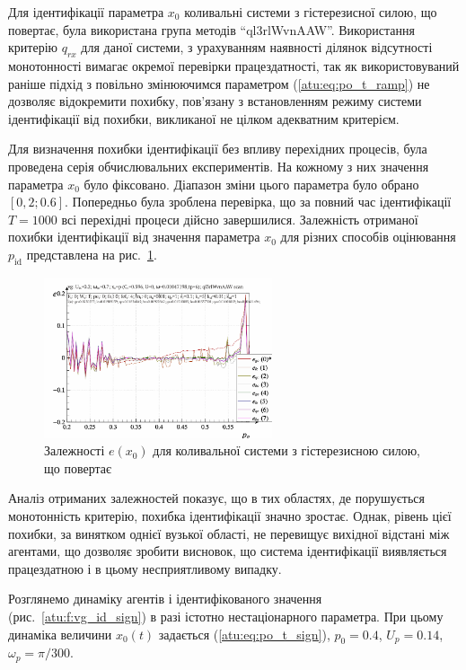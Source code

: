 Для ідентифікації параметра
$x_0$ коливальні системи з гістерезисної силою, що повертає, була
використана група методів ``ql3rlWvnAAW''. Використання критерію
$q_{rx}$ для даної системи, з урахуванням наявності ділянок
відсутності монотонності вимагає окремої перевірки
працездатності, так як використовуваний раніше підхід
з повільно змінюючимся параметром (\ref{atu:eq:po_t_ramp}) не дозволяє
відокремити похибку, пов'язану з встановленням режиму системи
ідентифікації від похибки, викликаної не цілком адекватним
критерієм.

Для визначення похибки ідентифікації без впливу перехідних
процесів, була проведена серія обчислювальних експериментів.
На кожному з них значення параметра
$x_0$ було фіксовано. Діапазон зміни цього параметра було обрано
$[0,2; 0.6] $. Попередньо була зроблена перевірка, що за повний час
ідентифікації
$T = 1000 $ всі перехідні процеси дійсно завершилися. Залежність
отриманої похибки ідентифікації від значення параметра
$x_0 $ для різних способів оцінювання
$p_\mathrm{id} $ представлена на рис.~\ref{atu:f:vg_id_scan}.

\begin{figure}[htb!]
\begin{center}
  \includegraphics[width=0.60\textwidth]{p/cha/vg/vg_id-p_p_e_ql3rlWvnAAW_scan.png}
\end{center}
\caption{Залежності $e(x_0) $ для коливальної системи з гістерезисною силою, що повертає }
\label{atu:f:vg_id_scan}
\end{figure}

Аналіз отриманих залежностей показує, що в тих областях, де
порушується монотонність критерію, похибка ідентифікації
значно зростає. Однак, рівень цієї похибки, за винятком однієї
вузької області, не перевищує вихідної відстані між агентами,
що дозволяє зробити висновок, що система ідентифікації
виявляється працездатною і в цьому несприятливому випадку.

Розглянемо динаміку агентів і ідентифікованого значення
(рис.~\ref{atu:f:vg_id_sign}) в разі істотно нестаціонарного параметра. При
цьому динаміка величини
$x_0 (t) $ задається (\ref{atu:eq:po_t_sign}),
$p_0 = 0.4$,
$U_p = 0.14$,
$\omega_p = \pi/300 $.

